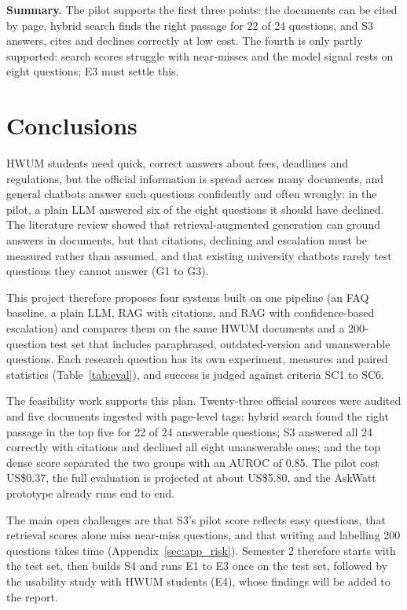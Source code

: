 \documentclass[12pt,nonacm,acmlarge,titlepage,screen]{acmart}
\begin{document}
\textbf{Summary.} The pilot supports the first three points: the documents can be cited by page, hybrid search finds the right passage for 22 of 24 questions, and S3 answers, cites and declines correctly at low cost. The fourth is only partly supported: search scores struggle with near-misses and the model signal rests on eight questions; E3 must settle this.

\section{Conclusions} \label{cha:concl}

HWUM students need quick, correct answers about fees, deadlines and regulations, but the official information is spread across many documents, and general chatbots answer such questions confidently and often wrongly: in the pilot, a plain LLM answered six of the eight questions it should have declined. The literature review showed that retrieval-augmented generation can ground answers in documents, but that citations, declining and escalation must be measured rather than assumed, and that existing university chatbots rarely test questions they cannot answer (G1 to G3).

This project therefore proposes four systems built on one pipeline (an FAQ baseline, a plain LLM, RAG with citations, and RAG with confidence-based escalation) and compares them on the same HWUM documents and a 200-question test set that includes paraphrased, outdated-version and unanswerable questions. Each research question has its own experiment, measures and paired statistics (Table~\ref{tab:eval}), and success is judged against criteria SC1 to SC6.

The feasibility work supports this plan. Twenty-three official sources were audited and five documents ingested with page-level tags; hybrid search found the right passage in the top five for 22 of 24 answerable questions; S3 answered all 24 correctly with citations and declined all eight unanswerable ones; and the top dense score separated the two groups with an AUROC of 0.85. The pilot cost US\$0.37, the full evaluation is projected at about US\$5.80, and the AskWatt prototype already runs end to end.

The main open challenges are that S3's pilot score reflects easy questions, that retrieval scores alone miss near-miss questions, and that writing and labelling 200 questions takes time (Appendix~\ref{sec:app_risk}). Semester 2 therefore starts with the test set, then builds S4 and runs E1 to E3 once on the test set, followed by the usability study with HWUM students (E4), whose findings will be added to the report.
\end{document}
